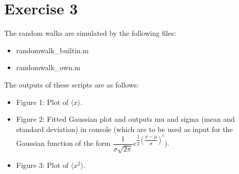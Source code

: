 \section*{Exercise 3}
The random walks are simulated by the following files:
\begin{itemize}
	\item randomwalk\_builtin.m
	\item randomwalk\_own.m
\end{itemize}
The outputs of these scripts are as follows:
\begin{itemize}
	\item Figure 1: Plot of $\langle x \rangle$.
	\item Figure 2: Fitted Gaussian plot and outputs mu and sigma (mean and standard deviation) in console (which are to be used as input for the Gaussian function of the form $\dfrac{1}{\sigma \sqrt{2 \pi}} e^{\dfrac{1}{2} (\dfrac{x-\mu}{\sigma})^{2}}$).
	\item Figure 3: Plot of $\langle x^{2} \rangle$.
\end{itemize}
